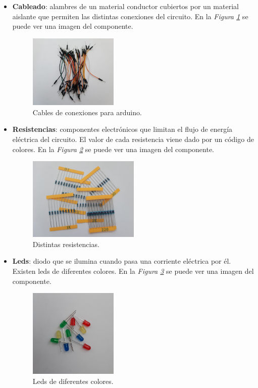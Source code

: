 \begin{itemize}
\item \textbf{Cableado}: alambres de un material conductor cubiertos por un material aislante que permiten las distintas conexiones del circuito. En la \textit{Figura \ref{fig:cableado}} se puede ver una imagen del componente.
\begin{figure}[h!]
    \centering
    \includegraphics[width=0.4\textwidth]{img/imgCableado.JPG}
    \caption{Cables de conexiones para arduino.}
    \label{fig:cableado}
\end{figure}

\item \textbf{Resistencias}: componentes electrónicos que limitan el flujo de energía eléctrica del circuito. El valor de cada resistencia viene dado por un código de colores. En la \textit{Figura \ref{fig:resistencias}} se puede ver una imagen del componente.
\begin{figure}[h!]
    \centering
    \includegraphics[width=0.5\textwidth]{img/imgResistencias.JPG}
    \caption{Distintas resistencias.}
    \label{fig:resistencias} 
\end{figure}

\item \textbf{Leds}: diodo que se ilumina cuando pasa una corriente eléctrica por él. Existen leds de diferentes colores. En la \textit{Figura \ref{fig:leds}} se puede ver una imagen del componente.
\begin{figure}[h!]
    \centering
    \includegraphics[width=0.4\textwidth]{img/imgLeds.JPG}
    \caption{Leds de diferentes colores.}
    \label{fig:leds} 
\end{figure}


\end{itemize}
